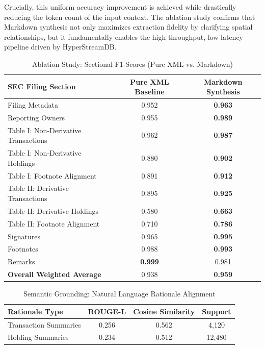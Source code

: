 \documentclass[journal, onecolumn]{IEEEtran}
\begin{document}
Crucially, this uniform accuracy improvement is achieved while drastically reducing the token count of the input context. The ablation study confirms that Markdown synthesis not only maximizes extraction fidelity by clarifying spatial relationships, but it fundamentally enables the high-throughput, low-latency pipeline driven by HyperStreamDB.

\begin{table}[h]
\centering
\caption{Ablation Study: Sectional F1-Scores (Pure XML vs. Markdown)}
\label{tab:ablation_results}
\begin{tabular}{lcc}
\toprule
\textbf{SEC Filing Section} & \textbf{Pure XML Baseline} & \textbf{Markdown Synthesis} \\
\midrule
Filing Metadata & 0.952 & \textbf{0.963} \\
Reporting Owners & 0.955 & \textbf{0.989} \\
Table I: Non-Derivative Transactions & 0.962 & \textbf{0.987} \\
Table I: Non-Derivative Holdings & 0.880 & \textbf{0.902} \\
Table I: Footnote Alignment & 0.891 & \textbf{0.912} \\ \hline
Table II: Derivative Transactions & 0.895 & \textbf{0.925} \\
Table II: Derivative Holdings & 0.580 & \textbf{0.663} \\
Table II: Footnote Alignment & 0.710 & \textbf{0.786} \\ \hline
Signatures & 0.965 & \textbf{0.995} \\
Footnotes & 0.988 & \textbf{0.993} \\
Remarks & \textbf{0.999} & 0.981 \\ \hline
\textbf{Overall Weighted Average} & 0.938 & \textbf{0.959} \\ \bottomrule
\end{tabular}
\end{table}



\begin{table}[h]
\centering
\caption{Semantic Grounding: Natural Language Rationale Alignment}
\label{tab:semantic_results}
\begin{tabular}{lccc}
\toprule
\textbf{Rationale Type} & \textbf{ROUGE-L} & \textbf{Cosine Similarity} & \textbf{Support} \\
\midrule
Transaction Summaries & 0.256 & 0.562 & 4,120 \\
Holding Summaries & 0.234 & 0.512 & 12,480 \\
\bottomrule
\end{tabular}
\end{table}
\end{document}
